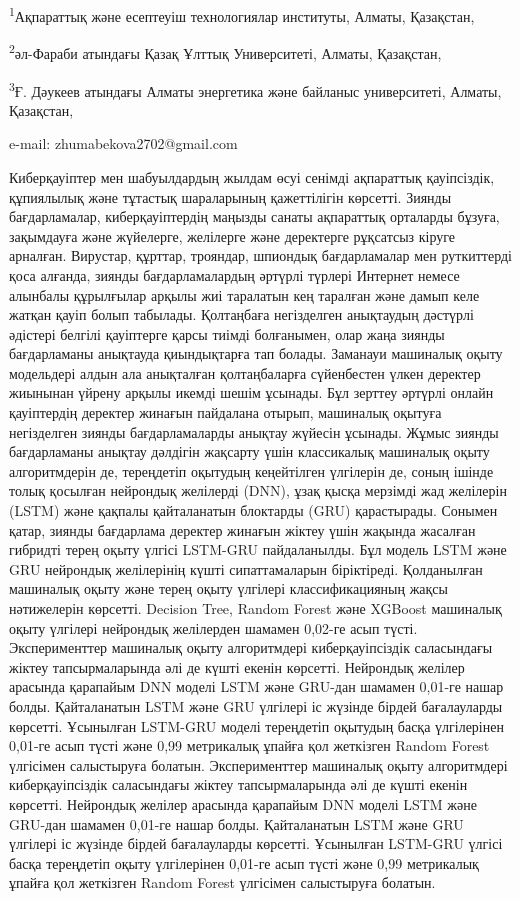 \begin{affiliation}
\textsuperscript{1}Ақпараттық және есептеуіш технологиялар институты,
Алматы, Қазақстан,

\textsuperscript{2}әл-Фараби атындағы Қазақ Ұлттық Университеті, Алматы,
Қазақстан,

\textsuperscript{3}Ғ. Дәукеев атындағы Алматы энергетика және байланыс
университеті, Алматы, Қазақстан,

e-mail: zhumabekova2702@gmail.com
\end{affiliation}

Киберқауіптер мен шабуылдардың жылдам өсуі сенімді ақпараттық
қауіпсіздік, құпиялылық және тұтастық шараларының қажеттілігін көрсетті.
Зиянды бағдарламалар, киберқауіптердің маңызды санаты ақпараттық
орталарды бұзуға, зақымдауға және жүйелерге, желілерге және деректерге
рұқсатсыз кіруге арналған. Вирустар, құрттар, трояндар, шпиондық
бағдарламалар мен руткиттерді қоса алғанда, зиянды бағдарламалардың
әртүрлі түрлері Интернет немесе алынбалы құрылғылар арқылы жиі таралатын
кең таралған және дамып келе жатқан қауіп болып табылады. Қолтаңбаға
негізделген анықтаудың дәстүрлі әдістері белгілі қауіптерге қарсы тиімді
болғанымен, олар жаңа зиянды бағдарламаны анықтауда қиындықтарға тап
болады. Заманауи машиналық оқыту модельдері алдын ала анықталған
қолтаңбаларға сүйенбестен үлкен деректер жиынынан үйрену арқылы икемді
шешім ұсынады. Бұл зерттеу әртүрлі онлайн қауіптердің деректер жинағын
пайдалана отырып, машиналық оқытуға негізделген зиянды бағдарламаларды
анықтау жүйесін ұсынады. Жұмыс зиянды бағдарламаны анықтау дәлдігін
жақсарту үшін классикалық машиналық оқыту алгоритмдерін де, тереңдетіп
оқытудың кеңейтілген үлгілерін де, соның ішінде толық қосылған нейрондық
желілерді (DNN), ұзақ қысқа мерзімді жад желілерін (LSTM) және қақпалы
қайталанатын блоктарды (GRU) қарастырады. Сонымен қатар, зиянды
бағдарлама деректер жинағын жіктеу үшін жақында жасалған гибридті терең
оқыту үлгісі LSTM-GRU пайдаланылды. Бұл модель LSTM және GRU нейрондық
желілерінің күшті сипаттамаларын біріктіреді. Қолданылған машиналық
оқыту және терең оқыту үлгілері классификацияның жақсы нәтижелерін
көрсетті. Decision Tree, Random Forest және XGBoost машиналық оқыту
үлгілері нейрондық желілерден шамамен 0,02-ге асып түсті. Эксперименттер
машиналық оқыту алгоритмдері киберқауіпсіздік саласындағы жіктеу
тапсырмаларында әлі де күшті екенін көрсетті. Нейрондық желілер арасында
қарапайым DNN моделі LSTM және GRU-дан шамамен 0,01-ге нашар болды.
Қайталанатын LSTM және GRU үлгілері іс жүзінде бірдей бағалауларды
көрсетті. Ұсынылған LSTM-GRU моделі тереңдетіп оқытудың басқа
үлгілерінен 0,01-ге асып түсті және 0,99 метрикалық ұпайға қол жеткізген
Random Forest үлгісімен салыстыруға болатын. Эксперименттер машиналық
оқыту алгоритмдері киберқауіпсіздік саласындағы жіктеу тапсырмаларында
әлі де күшті екенін көрсетті. Нейрондық желілер арасында қарапайым DNN
моделі LSTM және GRU-дан шамамен 0,01-ге нашар болды. Қайталанатын LSTM
және GRU үлгілері іс жүзінде бірдей бағалауларды көрсетті. Ұсынылған
LSTM-GRU үлгісі басқа тереңдетіп оқыту үлгілерінен 0,01-ге асып түсті
және 0,99 метрикалық ұпайға қол жеткізген Random Forest үлгісімен
салыстыруға болатын.

